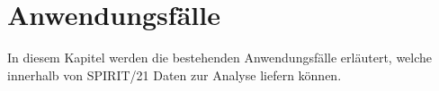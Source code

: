 \chapter{Anwendungsfälle}\label{chapter:Anwendungsfäll}
In diesem Kapitel werden die bestehenden Anwendungsfälle erläutert, welche innerhalb von \mbox{SPIRIT/21} Daten zur Analyse liefern können.











